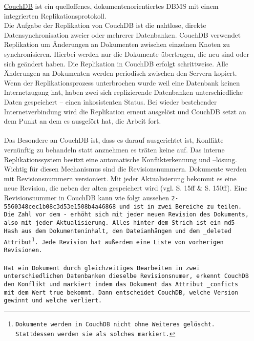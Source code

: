 \hyperref[chap:couch]{CouchDB} ist ein quelloffenes, dokumentenorientiertes \gls{DBMS} mit einem integrierten Replikationsprotokoll.\\
Die Aufgabe der Replikation von CouchDB ist die nahtlose, direkte Datensynchronisation zweier oder mehrerer Datenbanken.
CouchDB verwendet Replikation um Änderungen an Dokumenten zwischen einzelnen Knoten zu synchronisieren.
Hierbei werden nur die Dokumente übertragen, die neu sind oder sich geändert haben.
Die Replikation in CouchDB erfolgt schrittweise. Alle Änderungen an Dokumenten werden periodisch zwischen den Servern kopiert.
Wenn der Replikationsprozess unterbrochen wurde weil eine Datenbank keinen Internetzugang hat, haben zwei sich replizierende Datenbanken unterschiedliche Daten gespeichert -- einen inkosistenten Status.
Bei wieder bestehender Internetverbindung wird die Replikation erneut ausgelöst und CouchDB setzt an dem Punkt an dem es ausgefört hat, die Arbeit fort.\\\\
%
Das Besondere an CouchDB ist, dass es darauf ausgerichtet ist, Konflikte vernünftig zu behandeln statt anznehmen es träten keine auf.
Das interne Replikationssystem besitzt eine automatische Konflikterkennung und --lösung.\\
Wichtig für diesen Mechanismus sind die Revisionsnummern.
Dokumente werden mit Revisionsnummern versioniert. Mit jeder Aktualisierung bekommt es eine neue Revision, die neben der alten gespeichert wird (vgl. \cite{couchDB} S. 15ff \& S. 150ff). 
Eine Revisionsnummer in CouchDB kann wie folgt aussehen \tt{2-5560348cec1b08c3d53e1508b4a46868} und ist in zwei Bereiche zu teilen. Die Zahl vor dem \tt{-} erhöht sich mit jeder neuen Revision des Dokuments, also mit jeder Aktualisierung. Alles hinter dem Strich ist ein md5--\gls{Hash} aus dem Dokumenteninhalt, den Dateianhängen und dem \tt{\_deleted} Attribut\footnote{ Dokumente werden in CouchDB nicht ohne Weiteres gelöscht. Stattdessen werden sie als solches markiert.}. Jede Revision hat außerdem eine Liste von vorherigen Revisionen.\\\\
Hat ein Dokument durch gleichzeitiges Bearbeiten in zwei unterschiedlichen Datenbanken dieselbe Revisionsnumer, erkennt CouchDB den Konflikt und markiert indem das Dokument das Attribut \tt{\_conficts} mit dem Wert \tt{true} bekommt. Dann entscheidet CouchDB, welche Version gewinnt und welche verliert.
